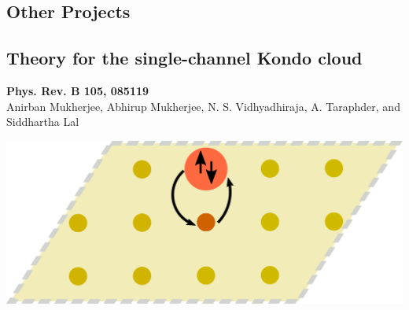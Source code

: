 \documentclass[8pt,aspectratio=169]{beamer}
\begin{document}
\begin{frame}{}
\section{Other Projects}
\end{frame}

\begin{frame}{}
\section{Theory for the single-channel Kondo cloud}
\begin{minipage}{0.55\textwidth}
	\small{{\bf Phys. Rev. B 105, 085119}\\[10pt]
Anirban Mukherjee, \alert{Abhirup Mukherjee}, N. S. Vidhyadhiraja, A. Taraphder, and Siddhartha Lal}
\end{minipage}
\hspace*{\fill}
\begin{minipage}{0.4\textwidth}
	\includegraphics[width=\textwidth]{kondo-effect.pdf}
\end{minipage}
\end{frame}
\end{document}
